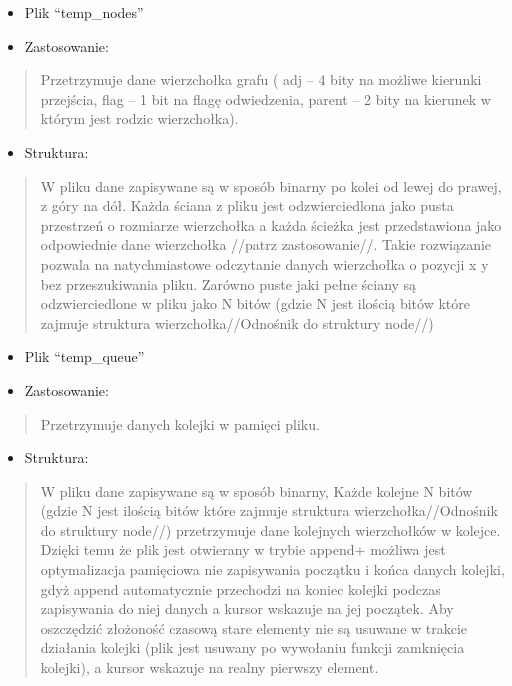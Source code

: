 \documentclass[
]{article}
\begin{document}
\begin{itemize}
\item
  Plik ``temp\_nodes''
\end{itemize}

\begin{itemize}
\item
  Zastosowanie:
\end{itemize}

\begin{quote}
Przetrzymuje dane wierzchołka grafu ( adj -- 4 bity na możliwe kierunki
przejścia, flag -- 1 bit na flagę odwiedzenia, parent -- 2 bity na
kierunek w którym jest rodzic wierzchołka).
\end{quote}

\begin{itemize}
\item
  Struktura:
\end{itemize}

\begin{quote}
W pliku dane zapisywane są w sposób binarny po kolei od lewej do prawej,
z góry na dół. Każda ściana z pliku jest odzwierciedlona jako pusta
przestrzeń o rozmiarze wierzchołka a każda ścieżka jest przedstawiona
jako odpowiednie dane wierzchołka //patrz zastosowanie//. Takie
rozwiązanie pozwala na natychmiastowe odczytanie danych wierzchołka o
pozycji x y bez przeszukiwania pliku. Zarówno puste jaki pełne ściany są
odzwierciedlone w pliku jako N bitów (gdzie N jest ilością bitów które
zajmuje struktura wierzchołka//Odnośnik do struktury node//)
\end{quote}

\begin{itemize}
\item
  Plik ``temp\_queue''
\end{itemize}

\begin{itemize}
\item
  Zastosowanie:
\end{itemize}

\begin{quote}
Przetrzymuje danych kolejki w pamięci pliku.
\end{quote}

\begin{itemize}
\item
  Struktura:
\end{itemize}

\begin{quote}
W pliku dane zapisywane są w sposób binarny, Każde kolejne N bitów
(gdzie N jest ilością bitów które zajmuje struktura
wierzchołka//Odnośnik do struktury node//) przetrzymuje dane kolejnych
wierzchołków w kolejce. Dzięki temu że plik jest otwierany w trybie
append+ możliwa jest optymalizacja pamięciowa nie zapisywania początku i
końca danych kolejki, gdyż append automatycznie przechodzi na koniec
kolejki podczas zapisywania do niej danych a kursor wskazuje na jej
początek. Aby oszczędzić złożoność czasową stare elementy nie są usuwane
w trakcie działania kolejki (plik jest usuwany po wywołaniu funkcji
zamknięcia kolejki), a kursor wskazuje na realny pierwszy element.
\end{quote}
\end{document}
